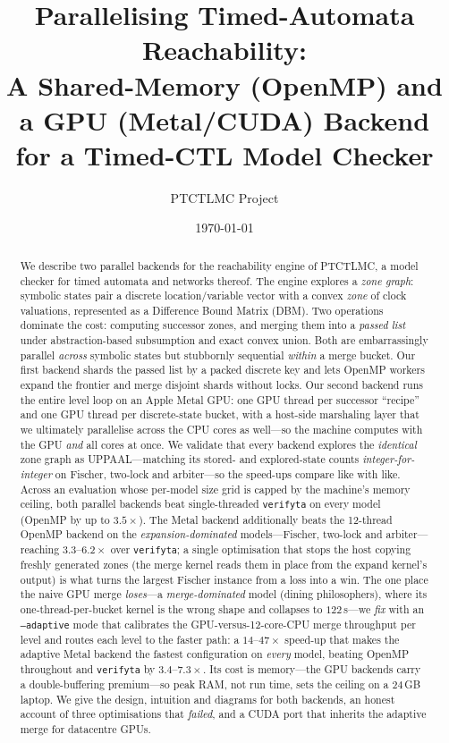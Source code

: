 \documentclass[11pt]{article}
\title{\bfseries Parallelising Timed-Automata Reachability:\\[2pt]
  \large A Shared-Memory (OpenMP) and a GPU (Metal/CUDA) Backend for a Timed-CTL Model Checker}
\author{PTCTLMC Project}
\date{\today}
\newcommand{\code}[1]{\texttt{\small #1}}
\begin{document}
\maketitle

\begin{abstract}
\noindent
We describe two parallel backends for the reachability engine of \textsc{PTCTLMC}, a model
checker for timed automata and networks thereof. The engine explores a \emph{zone graph}:
symbolic states pair a discrete location/variable vector with a convex \emph{zone} of clock
valuations, represented as a Difference Bound Matrix (DBM). Two operations dominate the cost:
computing successor zones, and merging them into a \emph{passed list} under
abstraction-based subsumption and exact convex union. Both are embarrassingly parallel
\emph{across} symbolic states but stubbornly sequential \emph{within} a merge bucket.
Our first backend shards the passed list by a packed discrete key and lets OpenMP workers
expand the frontier and merge disjoint shards without locks. Our second backend runs the entire
level loop on an Apple Metal GPU: one GPU thread per successor ``recipe'' and one GPU thread per
discrete-state bucket, with a host-side marshaling layer that we ultimately parallelise across the
CPU cores as well---so the machine computes with the GPU \emph{and} all cores at once. We validate
that every backend explores the \emph{identical} zone graph as UPPAAL---matching its stored- and
explored-state counts \emph{integer-for-integer} on Fischer, two-lock and arbiter---so the
speed-ups compare like with like. Across an evaluation whose per-model size grid is capped by the
machine's memory ceiling, both parallel backends beat single-threaded \texttt{verifyta} on every
model (OpenMP by up to $3.5\times$). The Metal backend additionally beats the 12-thread OpenMP
backend on the \emph{expansion-dominated} models---Fischer, two-lock and arbiter---reaching
$3.3$--$6.2\times$ over \texttt{verifyta}; a single optimisation that stops the host copying freshly
generated zones (the merge kernel reads them in place from the expand kernel's output) is what turns
the largest Fischer instance from a loss into a win. The one place the naive GPU merge \emph{loses}---a
\emph{merge-dominated} model (dining philosophers), where its one-thread-per-bucket kernel is the
wrong shape and collapses to $122$\,s---we \emph{fix} with an \code{--adaptive} mode that calibrates
the GPU-versus-12-core-CPU merge throughput per level and routes each level to the faster path: a
$14$--$47\times$ speed-up that makes the adaptive Metal backend the fastest configuration on
\emph{every} model, beating OpenMP throughout and \code{verifyta} by $3.4$--$7.3\times$. Its cost is
memory---the GPU backends carry a double-buffering premium---so peak RAM, not run time, sets the
ceiling on a $24$\,GB laptop. We give the design, intuition and diagrams for both backends, an honest
account of three optimisations that \emph{failed}, and a CUDA port that inherits the adaptive merge for
datacentre GPUs.
\end{abstract}
\end{document}
